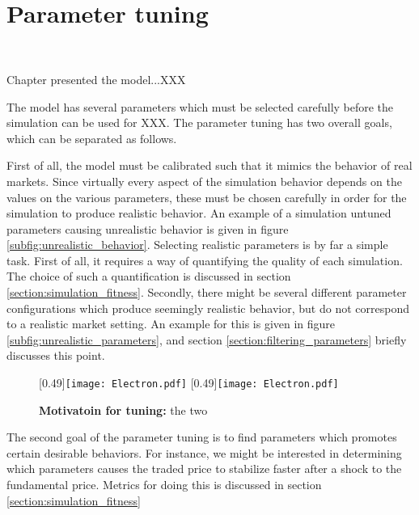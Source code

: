 
\chapter{Parameter tuning} %

\label{chapter:high_frequency_trading} %
$\frac{}{}$
	


Chapter \label{chapter:model_calibration} presented the model...XXX

The model has several parameters which must be selected carefully before the simulation can be used for XXX. The parameter tuning has two overall goals, which can be separated as follows. 

First of all, the model must be calibrated such that it mimics the behavior of real markets. Since virtually every aspect of the simulation behavior depends on the values on the various parameters, these must be chosen carefully in order for the simulation to produce realistic behavior. An example of a simulation untuned parameters causing  unrealistic behavior is given in figure \ref{subfig:unrealistic_behavior}. Selecting realistic parameters is by far a simple task. First of all, it requires a way of quantifying the quality of each simulation. The choice of such a quantification is discussed in section \ref{section:simulation_fitness}. Secondly, there might be several different parameter configurations which produce seemingly realistic behavior, but do not correspond to a realistic market setting. An example for this is given in figure \ref{subfig:unrealistic_parameters}, and section \ref{section:filtering_parameters} briefly discusses this point. 
\begin{figure}
[0.49\linewidth]{\texttt{[image: Electron.pdf]}}
[0.49\linewidth]{\texttt{[image: Electron.pdf]}}
\caption{\textbf{Motivatoin for tuning:} the two}\label{fig:tuning_motivation}
\end{figure}
The second goal of the parameter tuning is to find parameters which promotes certain desirable behaviors. For instance, we might be interested in determining which parameters causes the traded price to stabilize faster after a shock to the fundamental price. Metrics for doing this is discussed in section \ref{section:simulation_fitness}


